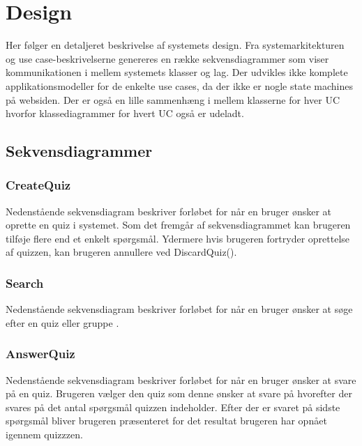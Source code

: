 \chapter{Design}
Her følger en detaljeret beskrivelse af systemets design. Fra systemarkitekturen og use case-beskrivelserne genereres en række sekvensdiagrammer som viser kommunikationen i mellem systemets klasser og lag. Der udvikles ikke komplete applikationsmodeller for de enkelte use cases, da der ikke er nogle state machines på websiden. Der er også en lille sammenhæng i mellem klasserne for hver UC hvorfor klassediagrammer for hvert UC også er udeladt.

\section{Sekvensdiagrammer}

\subsection*{CreateQuiz}
Nedenstående sekvensdiagram beskriver forløbet for når en bruger ønsker at oprette en quiz i systemet. Som det fremgår af sekvensdiagrammet kan brugeren tilføje flere end et enkelt spørgsmål. Ydermere hvis brugeren fortryder oprettelse af quizzen, kan brugeren annullere ved DiscardQuiz().


\subsection*{Search}
Nedenstående sekvensdiagram beskriver forløbet for når en bruger ønsker at søge efter en quiz eller gruppe .


\subsection*{AnswerQuiz}
Nedenstående sekvensdiagram beskriver forløbet for når en bruger ønsker at svare på en quiz. Brugeren vælger den quiz som denne ønsker at svare på hvorefter der svares på det antal spørgsmål quizzen indeholder. Efter der er svaret på sidste spørgsmål bliver brugeren præsenteret for det resultat brugeren har opnået igennem quizzzen.


